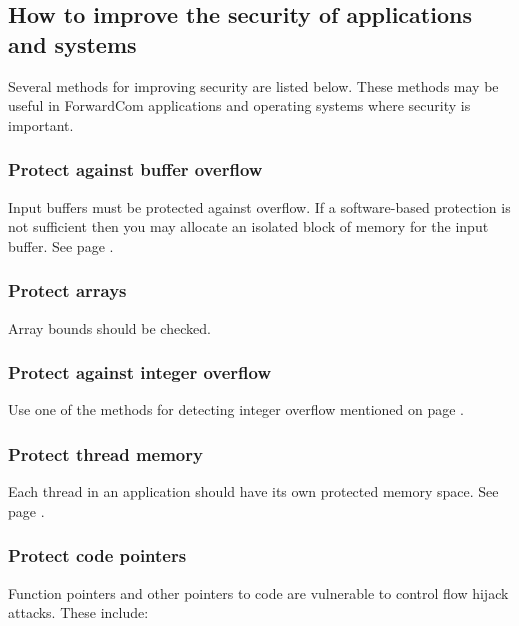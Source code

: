 \documentclass[forwardcom.tex]{subfiles}
\begin{document}
\subsection{How to improve the security of applications and systems}
Several methods for improving security are listed below. These methods may be useful in ForwardCom applications and operating systems where security is important.

\subsubsection{Protect against buffer overflow}
Input buffers must be protected against overflow. If a software-based protection is not sufficient then you may allocate an isolated block of memory for the input buffer. See page \pageref{isolatedMemoryBlocks}.

\subsubsection{Protect arrays} Array bounds should be checked.

\subsubsection{Protect against integer overflow} Use one of the methods for detecting integer overflow mentioned on page \pageref{integerOverflowDetection}.

\subsubsection{Protect thread memory} Each thread in an application should have its own protected memory space. See page \pageref{threadMemoryProtection}.

\subsubsection{Protect code pointers}
Function pointers and other pointers to code are vulnerable to control flow hijack attacks. These include:
\end{document}
